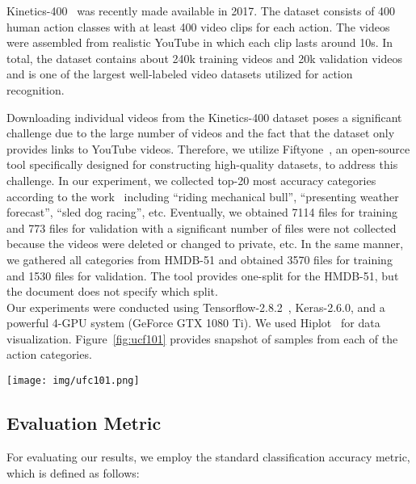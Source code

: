 \documentclass[fleqn,10pt]{wlscirep}
\begin{document}
Kinetics-400~\cite{kay2017kinetics} was recently made available in 2017. The dataset consists of 400 human action classes with at least 400 video clips for each action. The videos were assembled from realistic YouTube in which each clip lasts around 10s. In total, the dataset contains about 240k training videos and 20k validation videos and is one of the largest well-labeled video datasets utilized for action recognition.

Downloading individual videos from the Kinetics-400 dataset poses a significant challenge due to the large number of videos and the fact that the dataset only provides links to YouTube videos. Therefore, we utilize Fiftyone~\cite{fiftyone23}, an open-source tool specifically designed for constructing high-quality datasets, to address this challenge. In our experiment, we collected top-20 most accuracy categories according to the work~\cite{kay2017kinetics} including ``riding mechanical bull'', ``presenting weather forecast'', ``sled dog racing'', etc. Eventually, we obtained 7114 files for training and 773 files for validation with a significant number of files were not collected because the videos were deleted or changed to private, etc. In the same manner, we gathered all categories from HMDB-51 and obtained 3570 files for training and 1530 files for validation. The tool provides one-split for the HMDB-51, but the document does not specify which split.\\

Our experiments were conducted using Tensorflow-2.8.2~\cite{abadi2015tensorflow}, Keras-2.6.0, and a powerful 4-GPU system (GeForce\textsuperscript{\textregistered} GTX 1080 Ti). We used Hiplot~\cite{hiplot} for data visualization. Figure~\ref{fig:ucf101} provides snapshot of samples from each of the action categories.
\begin{figure*}[!htb]
\begin{center}
\texttt{[image: img/ufc101.png]}
\caption{A snapshot of samples of all actions from UCF-101 dataset~\cite{soomro2012ucf101}.}
\label{fig:ucf101}
\end{center}
\end{figure*}







\subsection{Evaluation Metric}
\label{sec:metric}
For evaluating our results, we employ the standard classification accuracy metric, which is defined as follows:
\end{document}
